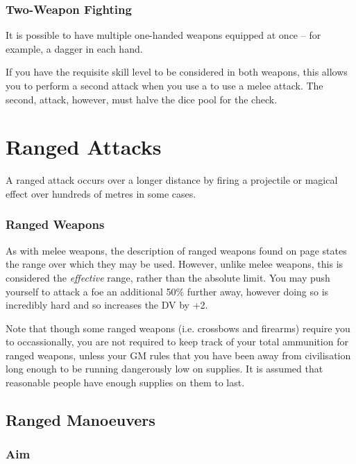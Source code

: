\subsubsection{Two-Weapon Fighting}

It is possible to have multiple one-handed weapons equipped at once -- for example, a dagger in each hand. 

If you have the requisite skill level to be considered  in both weapons, this allows you to perform a second attack when you use a  to use a melee attack. The second, attack, however, must halve the dice pool for the check.


\section{Ranged Attacks}

A ranged attack occurs over a longer distance by firing a projectile or magical effect over hundreds of metres in some cases. 

\subsubsection{Ranged Weapons}

As with melee weapons, the description of ranged weapons found on page \pageref{S:Weapons} states the range over which they may be used. However, unlike melee weapons, this is considered the {\it effective} range, rather than the absolute limit. You may push yourself to attack a foe an additional 50\% further away, however doing so is incredibly hard and so increases the DV by +2. 

Note that though some ranged weapons (i.e. crossbows and firearms) require you to  occassionally, you are not required to keep track of your total ammunition for ranged weapons, unless your GM rules that you have been away from civilisation long enough to be running dangerously low on supplies. It is assumed that reasonable people have enough supplies on them to last. 

\subsection{Ranged Manoeuvers}

\subsubsection{Aim}

